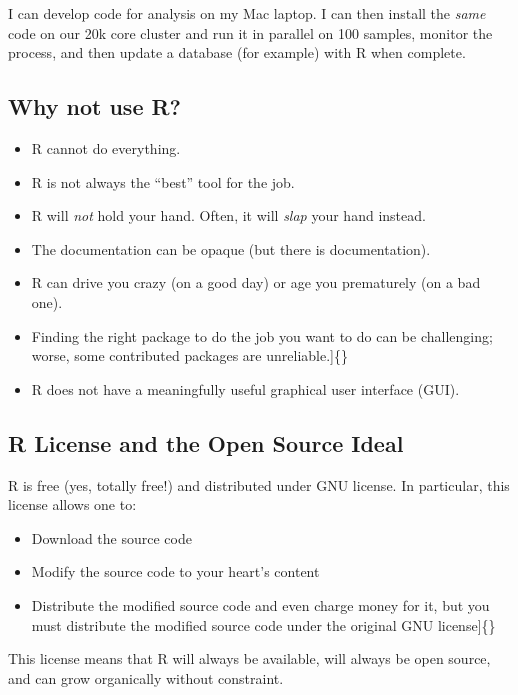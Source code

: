 \documentclass[]{article}
\providecommand{\tightlist}{%
  \setlength{\itemsep}{0pt}\setlength{\parskip}{0pt}}
\theoremstyle{definition}
\theoremstyle{definition}
\theoremstyle{remark}
\begin{document}
I can develop code for analysis on my Mac laptop. I can then install the
\emph{same} code on our 20k core cluster and run it in parallel on 100
samples, monitor the process, and then update a database (for example)
with R when complete.

\subsection{Why not use R?}\label{why-not-use-r}

\begin{itemize}
\tightlist
\item
  R cannot do everything.
\item
  R is not always the ``best'' tool for the job.
\item
  R will \emph{not} hold your hand. Often, it will \emph{slap} your hand
  instead.
\item
  The documentation can be opaque (but there is documentation).
\item
  R can drive you crazy (on a good day) or age you prematurely (on a bad
  one).
\item
  Finding the right package to do the job you want to do can be
  challenging; worse, some contributed packages are unreliable.{]}\{\}
\item
  R does not have a meaningfully useful graphical user interface (GUI).
\end{itemize}

\subsection{R License and the Open Source
Ideal}\label{r-license-and-the-open-source-ideal}

R is free (yes, totally free!) and distributed under GNU license. In
particular, this license allows one to:

\begin{itemize}
\tightlist
\item
  Download the source code
\item
  Modify the source code to your heart's content
\item
  Distribute the modified source code and even charge money for it, but
  you must distribute the modified source code under the original GNU
  license{]}\{\}
\end{itemize}

This license means that R will always be available, will always be open
source, and can grow organically without constraint.
\end{document}
